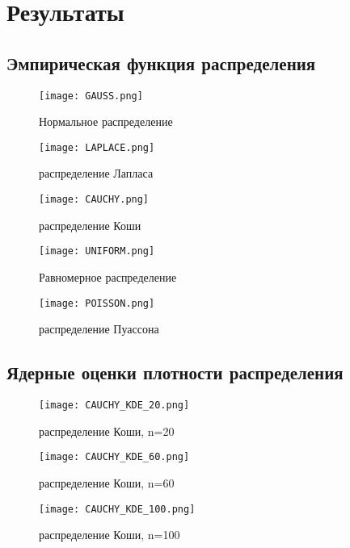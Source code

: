 \documentclass{article}
\begin{document}
\section {Результаты} 

\subsection{Эмпирическая функция распределения}
	\begin{figure}[H]
	\centering
	{\texttt{[image: GAUSS.png]}}
		\caption{Нормальное распределение} 
		\label{fig:normal}
	\end{figure}
	
\begin{figure}[H]
	{\texttt{[image: LAPLACE.png]}}
		\caption{распределение Лапласа} 
		\label{fig:normal}
	\end{figure}

\begin{figure}[H]
	{\texttt{[image: CAUCHY.png]}}
		\caption{распределение Коши} 
		\label{fig:normal}
	\end{figure}

\begin{figure}[H]
	{\texttt{[image: UNIFORM.png]}}
		\caption{Равномерное распределение} 
		\label{fig:normal}
	\end{figure}

\begin{figure}[H]
	{\texttt{[image: POISSON.png]}}
		\caption{распределение Пуассона} 
		\label{fig:normal}
	\end{figure}
	

	
\subsection{Ядерные оценки плотности распределения}
\begin{figure}[H]
	{\texttt{[image: CAUCHY\_KDE\_20.png]}}
		\caption{распределение Коши, n=20} 
		\label{fig:normal}
	\end{figure}
	
\begin{figure}[H]
	{\texttt{[image: CAUCHY\_KDE\_60.png]}}
		\caption{распределение Коши, n=60} 
		\label{fig:normal}
	\end{figure}
	
\begin{figure}[H]
	{\texttt{[image: CAUCHY\_KDE\_100.png]}}
		\caption{распределение Коши, n=100} 
		\label{fig:normal}
	\end{figure}
\end{document}
